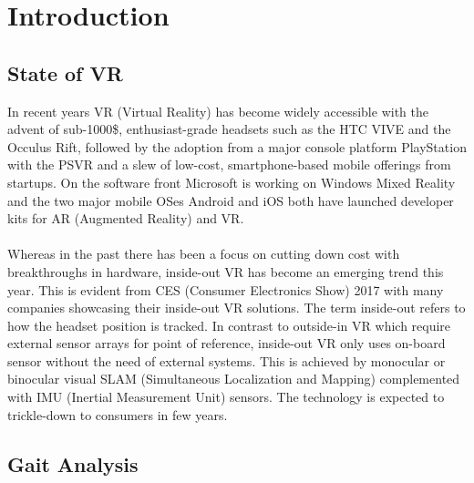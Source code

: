 
\chapter{Introduction} %

\label{Chapter1} %


\section{State of VR}

In recent years VR (Virtual Reality) has become widely accessible with the advent of sub-1000\$, enthusiast-grade headsets such as the HTC VIVE and the Occulus Rift, followed by the adoption from a major console platform PlayStation with the PSVR and a slew of low-cost, smartphone-based mobile offerings from startups. On the software front Microsoft is working on Windows Mixed Reality and the two major mobile OSes Android and iOS both have launched developer kits for AR (Augmented Reality) and VR.
\\\\
Whereas in the past there has been a focus on cutting down cost with breakthroughs in hardware, inside-out VR has become an emerging trend this year. This is evident from CES (Consumer Electronics Show) 2017 with many companies showcasing their inside-out VR solutions. The term inside-out refers to how the headset position is tracked. In contrast to outside-in VR which require external sensor arrays for point of reference, inside-out VR only uses on-board sensor without the need of external systems. This is achieved by monocular or binocular visual SLAM (Simultaneous Localization and Mapping) complemented with IMU (Inertial Measurement Unit) sensors. The technology is expected to trickle-down to consumers in few years.


\section{Gait Analysis}

